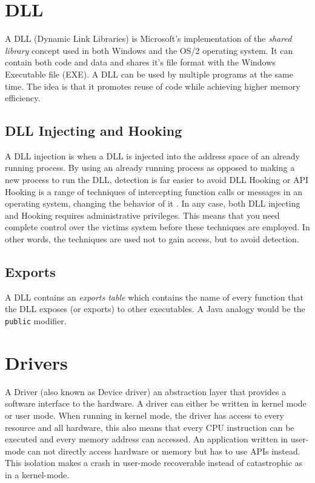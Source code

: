 \documentclass[11pt,english,a4paper]{report}
\begin{document}
\section{DLL}
A DLL (Dynamic Link Libraries) is Microsoft's implementation of the \textit{shared library} concept used in both Windows and the OS/2 operating system. It can contain both code and data and shares it's file format with the Windows Executable file (EXE). A DLL can be used by multiple programs at the same time. The idea is that it promotes reuse of code while achieving higher memory efficiency.

\subsection{DLL Injecting and Hooking} \label{DLL_HOOKING}
A DLL injection is when a DLL is injected into the address space of an already running process. By using an already running process as opposed to making a new process to run the DLL, detection is far easier to avoid \cite{DEJAN_HOOK} DLL Hooking or API Hooking is a range of techniques of intercepting function calls or messages in an operating system, changing the behavior of it \cite{BREMER_HOOK}. In any case, both DLL injecting and Hooking requires administrative privileges. This means that you need complete control over the victims system before these techniques are employed. In other words, the techniques are used not to gain access, but to avoid detection. 

\subsection{Exports} \label{EXPORTS}
A DLL contains an \textit{exports table} which contains the name of every function that the DLL exposes (or exports) to other executables. A Java analogy would be the \texttt{public} modifier.

\section{Drivers}
A Driver (also known as Device driver) an abstraction layer that provides a software interface to the hardware. A driver can either be written in kernel mode or user mode. When running in kernel mode, the driver has access to every resource and all hardware, this also means that every CPU instruction can be executed and every memory address can accessed. An application written in user-mode can not directly access hardware or memory but has to use APIs instead. This isolation makes a crash in user-mode recoverable instead of catastrophic as in a kernel-mode.
\end{document}
